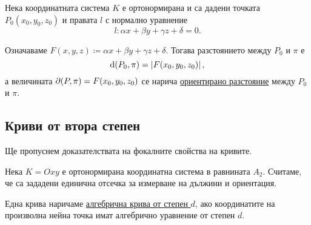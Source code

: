\documentclass[numbers=endperiod, DIV=15, bibliography=totocnumbered]{scrartcl}
\begin{document}
\begin{theorem}
  Нека координатната система $K$ е ортонормирана и са дадени точката $P_0(x_0, y_0, z_0)$ и правата $l$ с нормално уравнение
  \begin{displaymath}
    l: \alpha x + \beta y + \gamma z + \delta = 0.
  \end{displaymath}

  Означаваме $F(x, y, z) \coloneqq \alpha x + \beta y + \gamma z + \delta$. Тогава разстоянието между $P_0$ и $\pi$ е
  \begin{displaymath}
    \operatorname{d}(P_0, \pi) = \left\vert F(x_0, y_0, z_0) \right\vert,
  \end{displaymath}
  а величината $\partial(P, \pi) = F(x_0, y_0, z_0)$ се нарича \uline{ориентирано разстояние} между $P_0$ и $\pi$.
\end{theorem}

\subsection{Криви от втора степен}

\begin{note}
  Ще пропуснем доказателствата на фокалните свойства на кривите.
\end{note}

Нека $K = Oxy$ е ортонормирана координатна система в равнината $A_2$. Считаме, че са зададени единична отсечка за измерване на дължини и ориентация.

\begin{definition}
  Една крива наричаме \uline{алгебрична крива от степен $d$}, ако координатите на произволна нейна точка имат алгебрично уравнение от степен $d$.
\end{definition}
\end{document}
